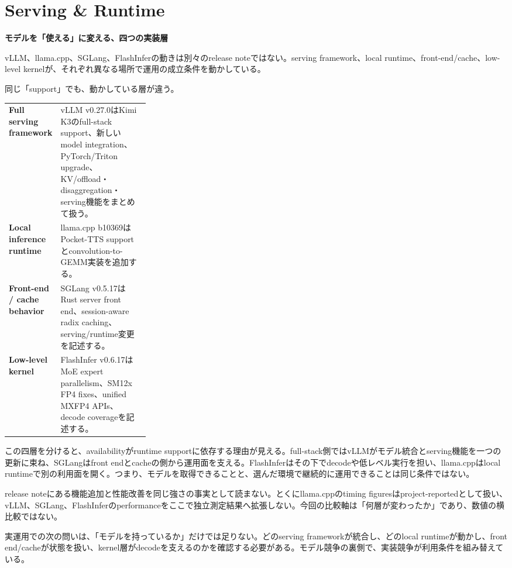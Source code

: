 \section{Serving \& Runtime}
\begin{wideflow}
{\Large\bfseries モデルを「使える」に変える、四つの実装層}\par
\smallskip
{\color{SurveyMuted}vLLM、llama.cpp、SGLang、FlashInferの動きは別々のrelease noteではない。serving framework、local runtime、front-end/cache、low-level kernelが、それぞれ異なる場所で運用の成立条件を動かしている。}\par
\end{wideflow}

同じ「support」でも、動かしている層が違う。

\begin{themeoverview}[四層の実装地図]
\begin{tabularx}{\linewidth}{@{}>{\bfseries}p{0.28\linewidth}X@{}}
Full serving framework & vLLM v0.27.0はKimi K3のfull-stack support、新しいmodel integration、PyTorch/Triton upgrade、KV/offload・disaggregation・serving機能をまとめて扱う\cite{vllm}。\\
Local inference runtime & llama.cpp b10369はPocket-TTS supportとconvolution-to-GEMM実装を追加する\cite{llamacpp}。\\
Front-end / cache behavior & SGLang v0.5.17はRust server front end、session-aware radix caching、serving/runtime変更を記述する\cite{sglang}。\\
Low-level kernel & FlashInfer v0.6.17はMoE expert parallelism、SM12x FP4 fixes、unified MXFP4 APIs、decode coverageを記述する\cite{flashinfer}。
\end{tabularx}
\end{themeoverview}

この四層を分けると、availabilityがruntime supportに依存する理由が見える。full-stack側ではvLLMがモデル統合とserving機能を一つの更新に束ね、SGLangはfront endとcacheの側から運用面を支える。FlashInferはその下でdecodeや低レベル実行を担い、llama.cppはlocal runtimeで別の利用面を開く。つまり、モデルを取得できることと、選んだ環境で継続的に運用できることは同じ条件ではない。

\begin{technicalnote}[Releaseを層で読む]
release noteにある機能追加と性能改善を同じ強さの事実として読まない。とくにllama.cppのtiming figuresはproject-reportedとして扱い、vLLM、SGLang、FlashInferのperformanceをここで独立測定結果へ拡張しない。今回の比較軸は「何層が変わったか」であり、数値の横比較ではない。
\end{technicalnote}

実運用での次の問いは、「モデルを持っているか」だけでは足りない。どのserving frameworkが統合し、どのlocal runtimeが動かし、front end/cacheが状態を扱い、kernel層がdecodeを支えるのかを確認する必要がある。モデル競争の裏側で、実装競争が利用条件を組み替えている。
